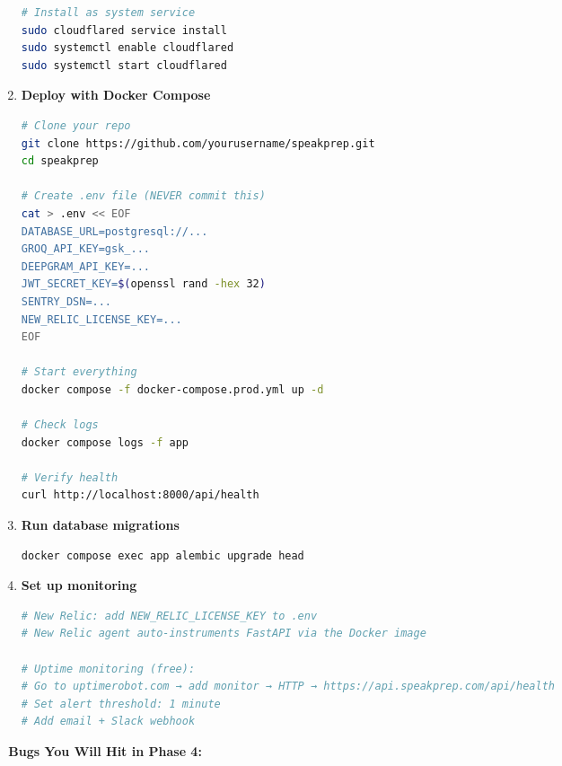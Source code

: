 \documentclass[
  11pt,
]{article}
\begin{document}
\begin{enumerate}
\begin{lstlisting}[language=bash]
# Install as system service
sudo cloudflared service install
sudo systemctl enable cloudflared
sudo systemctl start cloudflared
\end{lstlisting}
\item
  \textbf{Deploy with Docker Compose}

\begin{lstlisting}[language=bash]
# Clone your repo
git clone https://github.com/yourusername/speakprep.git
cd speakprep

# Create .env file (NEVER commit this)
cat > .env << EOF
DATABASE_URL=postgresql://...
GROQ_API_KEY=gsk_...
DEEPGRAM_API_KEY=...
JWT_SECRET_KEY=$(openssl rand -hex 32)
SENTRY_DSN=...
NEW_RELIC_LICENSE_KEY=...
EOF

# Start everything
docker compose -f docker-compose.prod.yml up -d

# Check logs
docker compose logs -f app

# Verify health
curl http://localhost:8000/api/health
\end{lstlisting}
\item
  \textbf{Run database migrations}

\begin{lstlisting}[language=bash]
docker compose exec app alembic upgrade head
\end{lstlisting}
\item
  \textbf{Set up monitoring}

\begin{lstlisting}[language=bash]
# New Relic: add NEW_RELIC_LICENSE_KEY to .env
# New Relic agent auto-instruments FastAPI via the Docker image

# Uptime monitoring (free):
# Go to uptimerobot.com → add monitor → HTTP → https://api.speakprep.com/api/health
# Set alert threshold: 1 minute
# Add email + Slack webhook
\end{lstlisting}
\end{enumerate}

\textbf{🐛 Bugs You Will Hit in Phase 4:}
\end{document}
